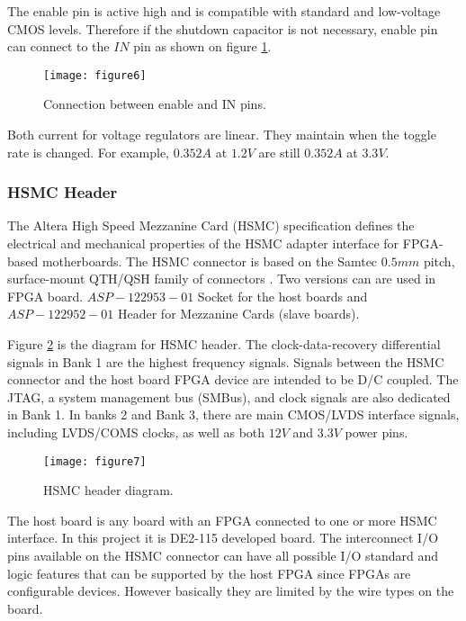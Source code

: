 The enable pin is active high and is compatible with standard and low-voltage CMOS levels. Therefore if the shutdown capacitor is not necessary, enable pin can connect to the $IN$ pin as shown on figure \ref{fig:b2_f6}.

\begin{figure}
 \centering
 \texttt{[image: figure6]}
 \caption{Connection between enable and IN pins.}
 \label{fig:b2_f6}
\end{figure}

Both current for voltage regulators are linear. They maintain when the toggle rate is changed. For example, $0.352A$ at $1.2V$ are still $0.352A$ at $3.3V$.


\subsubsection{HSMC Header}

The Altera High Speed Mezzanine Card (HSMC) specification defines the electrical and mechanical properties of the HSMC adapter interface for FPGA-based motherboards. The HSMC connector is based on the Samtec $0.5mm$ pitch, surface-mount QTH/QSH family of connectors \citep{Altera:2009:HSMCspec}. Two versions can are used in FPGA board. $ASP-122953-01$ Socket for the host boards and $ASP-122952-01$ Header for Mezzanine Cards (slave boards).

Figure \ref{fig:b2_f7} is the diagram for HSMC header. The clock-data-recovery differential signals in Bank 1 are the highest frequency signals. Signals between the HSMC connector and the host board FPGA device are intended to be D/C coupled. The JTAG, a system management bus (SMBus), and clock signals are also dedicated in Bank 1. In banks 2 and Bank 3, there are main CMOS/LVDS interface signals, including LVDS/COMS clocks, as well as both $12V$ and $3.3V$ power pins.

\begin{figure}
 \centering
 \texttt{[image: figure7]}
 \caption{HSMC header diagram.}
 \label{fig:b2_f7}
\end{figure}

The host board is any board with an FPGA connected to one or more HSMC interface. In this project it is DE2-115 developed board. The interconnect I/O pins available on the HSMC connector can have all possible I/O standard and logic features that can be supported by the host FPGA since FPGAs are configurable devices. However basically they are limited by the wire types on the board.


